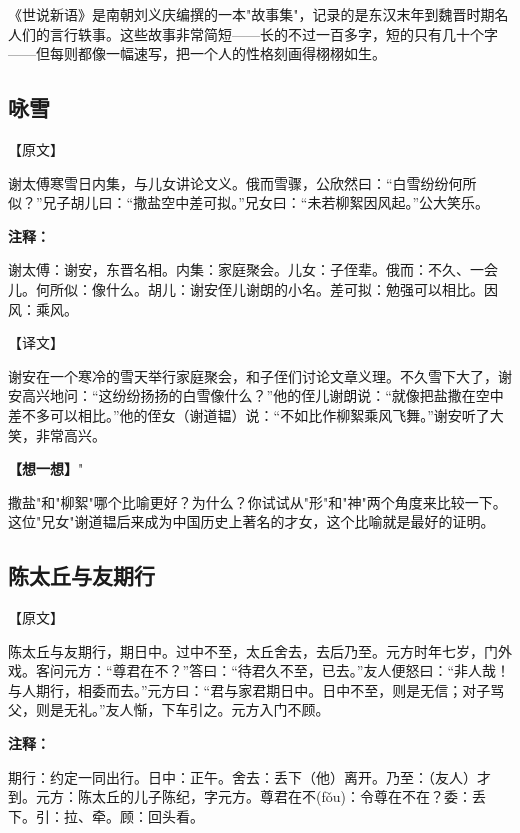 \documentclass[a4paper,12pt]{ctexart}
\newcommand{\annlist}[1]{{\vspace{0.15cm}\noindent\textcolor{orange!80!black}{\small\bfseries 注释：}\par\footnotesize #1\par}}
\newcommand{\thinkq}[1]{\vspace{0.2cm}\noindent\textcolor{orange!60!black}{\small\bfseries【想一想】}{\small #1}\par}
\begin{document}
《世说新语》是南朝刘义庆编撰的一本"故事集"，记录的是东汉末年到魏晋时期名人们的言行轶事。这些故事非常简短——长的不过一百多字，短的只有几十个字——但每则都像一幅速写，把一个人的性格刻画得栩栩如生。

\subsection*{咏雪}

\noindent\textcolor{blue!70!black}{\large【原文】}

谢太傅寒雪日内集，与儿女讲论文义。俄而雪骤，公欣然曰：\textquotedblleft 白雪纷纷何所似？\textquotedblright 兄子胡儿曰：\textquotedblleft 撒盐空中差可拟。\textquotedblright 兄女曰：\textquotedblleft 未若柳絮因风起。\textquotedblright 公大笑乐。

\annlist{谢太傅：谢安，东晋名相。内集：家庭聚会。儿女：子侄辈。俄而：不久、一会儿。何所似：像什么。胡儿：谢安侄儿谢朗的小名。差可拟：勉强可以相比。因风：乘风。}

\noindent\textcolor{green!60!black}{\large【译文】}

谢安在一个寒冷的雪天举行家庭聚会，和子侄们讨论文章义理。不久雪下大了，谢安高兴地问：\textquotedblleft 这纷纷扬扬的白雪像什么？\textquotedblright 他的侄儿谢朗说：\textquotedblleft 就像把盐撒在空中差不多可以相比。\textquotedblright 他的侄女（谢道韫）说：\textquotedblleft 不如比作柳絮乘风飞舞。\textquotedblright 谢安听了大笑，非常高兴。

\thinkq "撒盐"和"柳絮"哪个比喻更好？为什么？你试试从"形"和"神"两个角度来比较一下。这位"兄女"谢道韫后来成为中国历史上著名的才女，这个比喻就是最好的证明。

\subsection*{陈太丘与友期行}

\noindent\textcolor{blue!70!black}{\large【原文】}

陈太丘与友期行，期日中。过中不至，太丘舍去，去后乃至。元方时年七岁，门外戏。客问元方：\textquotedblleft 尊君在不？\textquotedblright 答曰：\textquotedblleft 待君久不至，已去。\textquotedblright 友人便怒曰：\textquotedblleft 非人哉！与人期行，相委而去。\textquotedblright 元方曰：\textquotedblleft 君与家君期日中。日中不至，则是无信；对子骂父，则是无礼。\textquotedblright 友人惭，下车引之。元方入门不顾。

\annlist{期行：约定一同出行。日中：正午。舍去：丢下（他）离开。乃至：（友人）才到。元方：陈太丘的儿子陈纪，字元方。尊君在不(fǒu)：令尊在不在？委：丢下。引：拉、牵。顾：回头看。}
\end{document}
